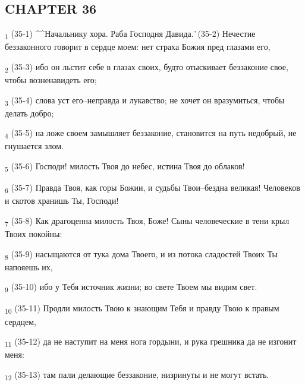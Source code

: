 \subsection{CHAPTER 36}
\begin{tcolorbox}
\textsubscript{1} (35-1) ^^Начальнику хора. Раба Господня Давида.^^ (35-2) Нечестие беззаконного говорит в сердце моем: нет страха Божия пред глазами его,
\end{tcolorbox}
\begin{tcolorbox}
\textsubscript{2} (35-3) ибо он льстит себе в глазах своих, будто отыскивает беззаконие свое, чтобы возненавидеть его;
\end{tcolorbox}
\begin{tcolorbox}
\textsubscript{3} (35-4) слова уст его--неправда и лукавство; не хочет он вразумиться, чтобы делать добро;
\end{tcolorbox}
\begin{tcolorbox}
\textsubscript{4} (35-5) на ложе своем замышляет беззаконие, становится на путь недобрый, не гнушается злом.
\end{tcolorbox}
\begin{tcolorbox}
\textsubscript{5} (35-6) Господи! милость Твоя до небес, истина Твоя до облаков!
\end{tcolorbox}
\begin{tcolorbox}
\textsubscript{6} (35-7) Правда Твоя, как горы Божии, и судьбы Твои--бездна великая! Человеков и скотов хранишь Ты, Господи!
\end{tcolorbox}
\begin{tcolorbox}
\textsubscript{7} (35-8) Как драгоценна милость Твоя, Боже! Сыны человеческие в тени крыл Твоих покойны:
\end{tcolorbox}
\begin{tcolorbox}
\textsubscript{8} (35-9) насыщаются от тука дома Твоего, и из потока сладостей Твоих Ты напояешь их,
\end{tcolorbox}
\begin{tcolorbox}
\textsubscript{9} (35-10) ибо у Тебя источник жизни; во свете Твоем мы видим свет.
\end{tcolorbox}
\begin{tcolorbox}
\textsubscript{10} (35-11) Продли милость Твою к знающим Тебя и правду Твою к правым сердцем,
\end{tcolorbox}
\begin{tcolorbox}
\textsubscript{11} (35-12) да не наступит на меня нога гордыни, и рука грешника да не изгонит меня:
\end{tcolorbox}
\begin{tcolorbox}
\textsubscript{12} (35-13) там пали делающие беззаконие, низринуты и не могут встать.
\end{tcolorbox}
